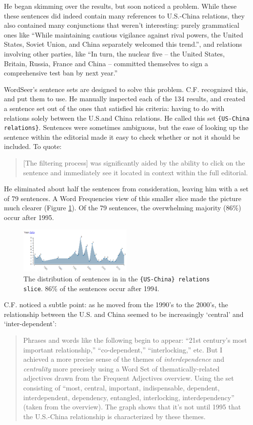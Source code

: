 \documentclass{sig-alternate}
\newcommand{\code}[1] {\texttt{#1}}
\begin{document}
He began skimming over the results, but soon noticed a problem. While these these sentences did indeed contain many references to U.S.-China relations, they also contained many conjunctions that weren't interesting: purely grammatical ones like ``While maintaining cautious vigilance against rival powers, the United States, Soviet Union, and China separately welcomed this trend.'', and relations involving other parties, like ``In turn, the nuclear five -- the United States, Britain, Russia, France and China -- committed themselves to sign a comprehensive test ban by next year.''

WordSeer's sentence sets are designed to solve this problem. C.F. recognized this, and put them to use. He manually inspected each of the 134 results, and created a sentence set out of the ones that satisfied his criteria: having to do with relations solely between the U.S.and China relations.  He called this set \code{\{US-China relations\}}. Sentences were sometimes ambiguous, but the ease of looking up the sentence within the editorial made it easy to check whether or not it should be included. To quote:
\begin{quote}
[The filtering process] was significantly aided by the ability to click on the sentence and immediately see it located in context within the full editorial.
\end{quote}
He eliminated about half the sentences from consideration, leaving him with a set of  79 sentences. A Word Frequencies view of this smaller slice made the picture much clearer (Figure \ref{fig:chris06}). Of the 79 sentences, the overwhelming majority (86\%) occur after 1995.
\begin{figure}[h!]
\includegraphics[width=0.5\textwidth]{fig/chris/06.png}
\caption{ The distribution of sentences in in the  \code{\{US-China\} relations slice}.  86\% of the sentences occur after 1994. \label{fig:chris06}}
\end{figure}
C.F. noticed a subtle point: as he moved from the 1990's to the 2000's, the relationship between the U.S. and China seemed to be increasingly  `central' and `inter-dependent':
\begin{quote}
Phrases and words like the following begin to appear: ``21st century's most important relationship,'' ``co-dependent,'' ``interlocking,'' etc. But I achieved a more precise sense of the themes of \emph{interdependence} and \emph{centrality } more precisely using a Word Set of thematically-related adjectives drawn from the Frequent Adjectives overview. Using the set consisting of ``most, central, important, indispensable, dependent, interdependent, dependency, entangled, interlocking, interdependency'' (taken from the overview). The graph shows that it's not until 1995 that the U.S.-China relationship is characterized by these themes.
\end{quote}
\end{document}
